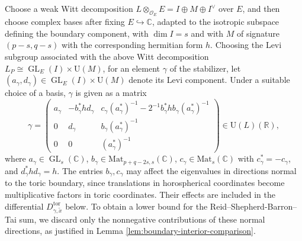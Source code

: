 \documentclass[11pt]{amsart}
\theoremstyle{plain}
\theoremstyle{definition}
\numberwithin{equation}{section}
\def\GL{\mathop{\mathrm{GL}}\nolimits}
\def\dim{\mathop{\mathrm{dim}}\nolimits}
\def\U{\mathrm{U}}
\newcommand{\bbC}{\mathbb{C}}
\newcommand{\bbR}{\mathbb{R}}
\newcommand{\Mat}{\mathrm{Mat}}
\begin{document}
Choose a weak Witt decomposition
$L\otimes_{\mathcal O_E}E=I\oplus M\oplus I^\vee$
over $E$, and then choose complex bases after fixing
$E\hookrightarrow\mathbb C$, adapted to the isotropic subspace defining the boundary component, with $\dim I=s$ and with $M$ of signature $(p-s,q-s)$ with the corresponding hermitian form $h$. Choosing the Levi subgroup associated with the above Witt
decomposition $L_P\cong \GL_E(I)\times \U(M)$, for an element $\gamma$ of the stabilizer,
let $(a_\gamma,d_\gamma)\in \GL_E(I)\times\U(M)$
denote its Levi component.  
Under a suitable choice of a basis, $\gamma$ is given as a matrix
\begin{equation}\label{description_gamma}
  \gamma =
  \begin{pmatrix}
    a_{\gamma} & -b_{\gamma}^* h d_\gamma & c_{\gamma} (a_{\gamma}^*)^{-1} - 2^{-1}b_\gamma^* h b_\gamma (a_\gamma^*)^{-1}\\
    0 & d_{\gamma} & b_\gamma (a_\gamma^{*})^{-1} \\
    0 & 0 & (a_{\gamma}^*)^{-1}
  \end{pmatrix}\in \U(L)(\bbR),
\end{equation}
where
$a_\gamma\in\GL_s(\bbC)$,
$b_\gamma\in\Mat_{p+q-2s,s}(\bbC)$,
$c_\gamma\in\Mat_s(\bbC)$ with $c_\gamma^*=-c_\gamma$,
and $d_\gamma^*h d_\gamma=h$.
The entries $b_\gamma,c_\gamma$ may affect the eigenvalues in
directions normal to the toric boundary, since translations
in horospherical coordinates become multiplicative factors
in toric coordinates.
Their effects are included in the differential
$D^{\mathrm{tor}}_{\gamma,\widetilde{x}}$ below.
To obtain a lower bound for the Reid--Shepherd-Barron--Tai sum,
we discard only the nonnegative contributions of these normal
directions, as justified in
Lemma \ref{lem:boundary-interior-comparison}.
\end{document}
